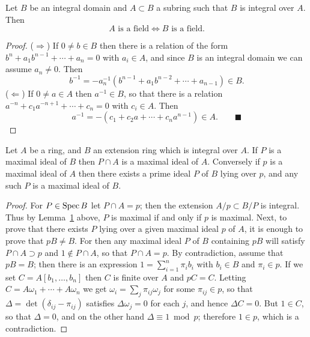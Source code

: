 \begin{lemma}\label{lem:9.1}
Let $B$ be an integral domain and $A \subset B$ a subring such that $B$ is
integral over $A$. Then
\[
  A \text{ is a field} \iff B \text{ is a field}.
\]
\end{lemma}

\begin{proof}
($\Rightarrow$) If $0 \neq b \in B$ then there is a relation of the form $b^n + a_1b^{n-1} + \cdots
+ a_n = 0$ with $a_i \in A$, and since $B$ is an integral domain we can assume $a_n \neq 0$.
Then
\[
  b^{-1} = -a_n^{-1}(b^{n-1} + a_1b^{n-2} + \cdots + a_{n-1}) \in B.
\]
($\Leftarrow$) If $0 \neq a \in A$ then $a^{-1} \in B$, so that there is a relation $a^{-n} + c_1a^{-n+1}
+ \cdots + c_n = 0$ with $c_i \in A$. Then
\[
  a^{-1} = -(c_1 + c_2a + \cdots + c_na^{n-1}) \in A. \qquad\blacksquare
\]
\end{proof}

\begin{lemma}\label{lem:9.2}
Let $A$ be a ring, and $B$ an extension ring which is integral over $A$.
If $P$ is a maximal ideal of $B$ then $P \cap A$ is a maximal ideal of $A$. Conversely if
$p$ is a maximal ideal of $A$ then there exists a prime ideal $P$ of $B$ lying over $p$,
and any such $P$ is a maximal ideal of $B$.
\end{lemma}

\begin{proof}
For $P \in \operatorname{Spec} B$ let $P \cap A = p$; then the extension $A/p \subset B/P$ is
integral. Thus by Lemma~\hyperref[lem:9.1]{1} above, $P$ is maximal if and only if $p$ is maximal.
Next, to prove that there exists $P$ lying over a given maximal ideal $p$ of $A$, it
is enough to prove that $pB \neq B$. For then any maximal ideal $P$ of $B$
containing $pB$ will satisfy $P \cap A \supset p$ and $1 \notin P \cap A$, so that $P \cap A = p$. By
contradiction, assume that $pB = B$; then there is an expression $1 = \sum_{i=1}^{n} \pi_ib_i$
with $b_i \in B$ and $\pi_i \in p$. If we set $C = A[b_1, \ldots, b_n]$ then $C$ is finite over $A$ and
$pC = C$. Letting $C = A\omega_1 + \cdots + A\omega_n$ we get $\omega_i = \sum_j \pi_{ij}\omega_j$ for some $\pi_{ij} \in p$,
so that $\Delta = \det(\delta_{ij} - \pi_{ij})$ satisfies $\Delta\omega_j = 0$ for each $j$, and hence $\Delta C = 0$. But
$1 \in C$, so that $\Delta = 0$, and on the other hand $\Delta \equiv 1 \bmod p$; therefore $1 \in p$,
which is a contradiction.
\end{proof}

